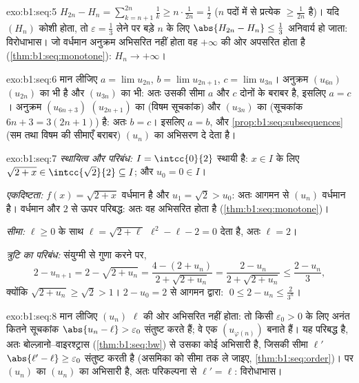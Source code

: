 \begin{solution}{exo:b1:seq:5}
$H_{2n} - H_n = \sum_{k=n+1}^{2n} \frac 1k \geq n \cdot \frac{1}{2n} =
\frac12$ ($n$ पदों में से प्रत्येक $\geq \frac{1}{2n}$ है)। यदि $(H_n)$ कोशी
होता, तो $\varepsilon = \frac13$ लेने पर बड़े $n$ के लिए $\abs{H_{2n} - H_n}
\leq \frac13$ अनिवार्य हो जाता: विरोधाभास। जो वर्धमान अनुक्रम अभिसरित नहीं
होता वह $+\infty$ की ओर अपसरित होता है (\cref{thm:b1:seq:monotone}): $H_n
\to +\infty$।
\end{solution}

\begin{solution}{exo:b1:seq:6}
मान लीजिए $a = \lim u_{2n}$, $b = \lim u_{2n+1}$, $c = \lim u_{3n}$। अनुक्रम
$(u_{6n})$ $(u_{2n})$ का भी  है और $(u_{3n})$ का भी: अतः उसकी सीमा
$a$ और $c$ दोनों के बराबर है, इसलिए $a = c$। अनुक्रम $(u_{6n+3})$
$(u_{2n+1})$ का (विषम सूचकांक) और $(u_{3n})$ का (सूचकांक $6n + 3 = 3(2n+1)$)
 है: अतः $b = c$। इसलिए $a = b$, और \cref{prop:b1:seq:subsequences}
(सम तथा विषम की सीमाएँ बराबर) $(u_n)$ का अभिसरण दे देता है।
\end{solution}

\begin{solution}{exo:b1:seq:7}
\emph{स्थायित्व और परिबंध:} $I = \intcc{0}{2}$ स्थायी है: $x \in I$ के लिए
$\sqrt{2 + x} \in \intcc{\sqrt 2}{2} \subseteq I$; और $u_0 = 0 \in I$।

\emph{एकदिष्टता:} $f(x) = \sqrt{2+x}$ वर्धमान है और $u_1 = \sqrt 2 > u_0$:
अतः आगमन से $(u_n)$ वर्धमान है। वर्धमान और $2$ से ऊपर परिबद्ध: अतः वह
अभिसरित होता है (\cref{thm:b1:seq:monotone})।

\emph{सीमा:} $\ell \geq 0$ के साथ $\ell = \sqrt{2 + \ell}$ $\ell^2 - \ell -
2 = 0$ देता है, अतः $\ell = 2$।

\emph{त्रुटि का परिबंध:} संयुग्मी से गुणा करने पर,
\[
2 - u_{n+1} = 2 - \sqrt{2 + u_n}
= \frac{4 - (2 + u_n)}{2 + \sqrt{2+u_n}}
= \frac{2 - u_n}{2 + \sqrt{2 + u_n}}
\leq \frac{2 - u_n}{3},
\]
क्योंकि $\sqrt{2 + u_n} \geq \sqrt 2 > 1$। $2 - u_0 = 2$ से आगमन द्वारा:
$\;0 \leq 2 - u_n \leq \frac{2}{3^n}$।
\end{solution}

\begin{solution}{exo:b1:seq:8}
मान लीजिए $(u_n)$ $\ell$ की ओर अभिसरित नहीं होता: तो किसी $\varepsilon_0 >
0$ के लिए अनंत कितने सूचकांक $\abs{u_n - \ell} > \varepsilon_0$ संतुष्ट करते
हैं; वे एक  $(u_{\varphi(n)})$ बनाते हैं। यह  परिबद्ध है,
अतः बोल्ज़ानो--वाइरश्ट्रास (\cref{thm:b1:seq:bw}) से उसका कोई अभिसारी
 है, जिसकी सीमा $\ell'$ $\abs{\ell' - \ell} \geq \varepsilon_0$
संतुष्ट करती है (असमिका को सीमा तक ले जाइए, \cref{thm:b1:seq:order})। पर
$(u_n)$ का  $(u_n)$ का अभिसारी  है, अतः परिकल्पना से
$\ell' = \ell$: विरोधाभास।
\end{solution}

